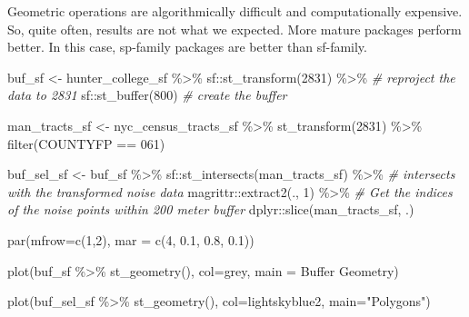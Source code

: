 \documentclass[
  11pt,
]{book}
\newenvironment{Shaded}{\begin{snugshade}}{\end{snugshade}}
\newcommand{\AttributeTok}[1]{\textcolor[rgb]{0.77,0.63,0.00}{#1}}
\newcommand{\CommentTok}[1]{\textcolor[rgb]{0.56,0.35,0.01}{\textit{#1}}}
\newcommand{\DecValTok}[1]{\textcolor[rgb]{0.00,0.00,0.81}{#1}}
\newcommand{\FloatTok}[1]{\textcolor[rgb]{0.00,0.00,0.81}{#1}}
\newcommand{\FunctionTok}[1]{\textcolor[rgb]{0.00,0.00,0.00}{#1}}
\newcommand{\NormalTok}[1]{#1}
\newcommand{\OtherTok}[1]{\textcolor[rgb]{0.56,0.35,0.01}{#1}}
\newcommand{\SpecialCharTok}[1]{\textcolor[rgb]{0.00,0.00,0.00}{#1}}
\newcommand{\StringTok}[1]{\textcolor[rgb]{0.31,0.60,0.02}{#1}}
\begin{document}
Geometric operations are algorithmically difficult and computationally expensive. So, quite often, results are not what we expected. More mature packages perform better. In this case, sp-family packages are better than sf-family.

\begin{Shaded}
\begin{Highlighting}[]
\NormalTok{buf\_sf }\OtherTok{\textless{}{-}}\NormalTok{  hunter\_college\_sf }\SpecialCharTok{\%\textgreater{}\%}\NormalTok{ sf}\SpecialCharTok{::}\FunctionTok{st\_transform}\NormalTok{(}\DecValTok{2831}\NormalTok{) }\SpecialCharTok{\%\textgreater{}\%} \CommentTok{\# reproject the data to 2831}
\NormalTok{    sf}\SpecialCharTok{::}\FunctionTok{st\_buffer}\NormalTok{(}\DecValTok{800}\NormalTok{) }\CommentTok{\# create the buffer}

\NormalTok{man\_tracts\_sf }\OtherTok{\textless{}{-}}\NormalTok{ nyc\_census\_tracts\_sf }\SpecialCharTok{\%\textgreater{}\%} 
  \FunctionTok{st\_transform}\NormalTok{(}\DecValTok{2831}\NormalTok{) }\SpecialCharTok{\%\textgreater{}\%}
  \FunctionTok{filter}\NormalTok{(COUNTYFP }\SpecialCharTok{==} \StringTok{\textquotesingle{}061\textquotesingle{}}\NormalTok{)}

\NormalTok{buf\_sel\_sf }\OtherTok{\textless{}{-}}\NormalTok{ buf\_sf }\SpecialCharTok{\%\textgreater{}\%} 
\NormalTok{    sf}\SpecialCharTok{::}\FunctionTok{st\_intersects}\NormalTok{(man\_tracts\_sf) }\SpecialCharTok{\%\textgreater{}\%} \CommentTok{\# intersects with the transformed noise data}
\NormalTok{    magrittr}\SpecialCharTok{::}\FunctionTok{extract2}\NormalTok{(., }\DecValTok{1}\NormalTok{) }\SpecialCharTok{\%\textgreater{}\%} \CommentTok{\# Get the indices of the noise points within 200 meter buffer}
\NormalTok{    dplyr}\SpecialCharTok{::}\FunctionTok{slice}\NormalTok{(man\_tracts\_sf, .) }

\FunctionTok{par}\NormalTok{(}\AttributeTok{mfrow=}\FunctionTok{c}\NormalTok{(}\DecValTok{1}\NormalTok{,}\DecValTok{2}\NormalTok{), }\AttributeTok{mar =} \FunctionTok{c}\NormalTok{(}\DecValTok{4}\NormalTok{, }\FloatTok{0.1}\NormalTok{, }\FloatTok{0.8}\NormalTok{, }\FloatTok{0.1}\NormalTok{))}

\FunctionTok{plot}\NormalTok{(buf\_sf }\SpecialCharTok{\%\textgreater{}\%} \FunctionTok{st\_geometry}\NormalTok{(), }
     \AttributeTok{col=}\StringTok{\textquotesingle{}grey\textquotesingle{}}\NormalTok{, }
     \AttributeTok{main =} \StringTok{\textquotesingle{}Buffer Geometry\textquotesingle{}}\NormalTok{)}

\FunctionTok{plot}\NormalTok{(buf\_sel\_sf  }\SpecialCharTok{\%\textgreater{}\%} \FunctionTok{st\_geometry}\NormalTok{(), }
     \AttributeTok{col=}\StringTok{\textquotesingle{}lightskyblue2\textquotesingle{}}\NormalTok{, }
     \AttributeTok{main=}\StringTok{"Polygons"}\NormalTok{)}
\end{Highlighting}
\end{Shaded}
\end{document}
